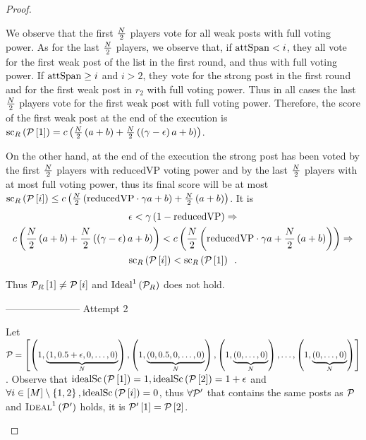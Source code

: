 \begin{proof}
\begin{itemize}
    We observe that the first $\frac{N}{2}$ players vote for all weak
    posts with full voting power. As for the last $\frac{N}{2}$
    players, we observe that, if $\mathrm{attSpan} < i$, they all vote for the first
    weak post of the list in the first round, and thus with full voting power. If
    $\mathrm{attSpan} \geq i$ and $i > 2$, they vote for the strong post in the first
    round and for the first weak post in $r_2$ with full voting power. Thus in
    all cases the last $\frac{N}{2}$ players vote for the first weak
    post with full voting power. Therefore, the score of the first weak post at
    the end of the execution is
    $\mathrm{sc}_{R}\left(\mathcal{P}\left[1\right]\right) =
    c\left(\frac{N}{2}\left(a + b\right) +
    \frac{N}{2}\left(\left(\gamma - \epsilon\right) a +
    b\right)\right)$.

    On the other hand, at the end of the execution the strong post has been
    voted by the first $\frac{N}{2}$ players with $\mathrm{reducedVP}$
    voting power and by the last $\frac{N}{2}$ players with at most
    full voting power, thus its final score will be at most
    $\mathrm{sc}_{R}\left(\mathcal{P}\left[i\right]\right) \leq
    c\left(\frac{N}{2}\left(\mathrm{reducedVP} \cdot \gamma a +
    b\right) + \frac{N}{2}\left(a + b\right)\right)$. It is
    \begin{gather*}
      \epsilon < \gamma\left(1 - \mathrm{reducedVP}\right) \Rightarrow \\
      c\left(\frac{N}{2}\left(a + b\right) +
      \frac{N}{2}\left(\left(\gamma - \epsilon\right) a +
      b\right)\right) < c\left(\frac{N}{2}\left(\mathrm{reducedVP}
      \cdot \gamma a + \frac{N}{2}\left(a + b\right)\right)\right)
      \Rightarrow \\
      \mathrm{sc}_{R}\left(\mathcal{P}\left[i\right]\right) <
      \mathrm{sc}_{R}\left(\mathcal{P}\left[1\right]\right) \enspace.
    \end{gather*}

    Thus $\mathcal{P}_{R}\left[1\right] \neq \mathcal{P}\left[i\right]$ and
    $\mathrm{Ideal}^1\left(\mathcal{P}_{R}\right)$ does not hold.

    ----------------------- Attempt 2

    Let $\mathcal{P} = \left[\left(1, \underbrace{\left(1, 0.5 + \epsilon, 0,
    \dots, 0\right)}_{N}\right), \left(1, \underbrace{\left(0, 0.5, 0,
    \dots, 0\right)}_{N}\right), \left(1, \underbrace{\left(0, \dots,
    0\right)}_{N}\right), \dots, \left(1, \underbrace{\left(0, \dots,
    0\right)}_{N}\right)\right]$. Observe that
    $\mathrm{idealSc}\left(\mathcal{P}\left[1\right]\right) = 1, \mathrm{idealSc}\left(\mathcal{P}\left[2\right]\right) = 1 +
    \epsilon$ and $\forall i \in \left[M\right] \setminus \left\{1,
    2\right\}, \mathrm{idealSc}\left(\mathcal{P}\left[i\right]\right) = 0$, thus $\forall \mathcal{P}'$
    that contains the same posts as $\mathcal{P}$ and
    $\textsc{Ideal}^1\left(\mathcal{P}'\right)$ holds, it is
    $\mathcal{P}'\left[1\right] = \mathcal{P}\left[2\right]$.


\end{itemize}
\end{proof}
